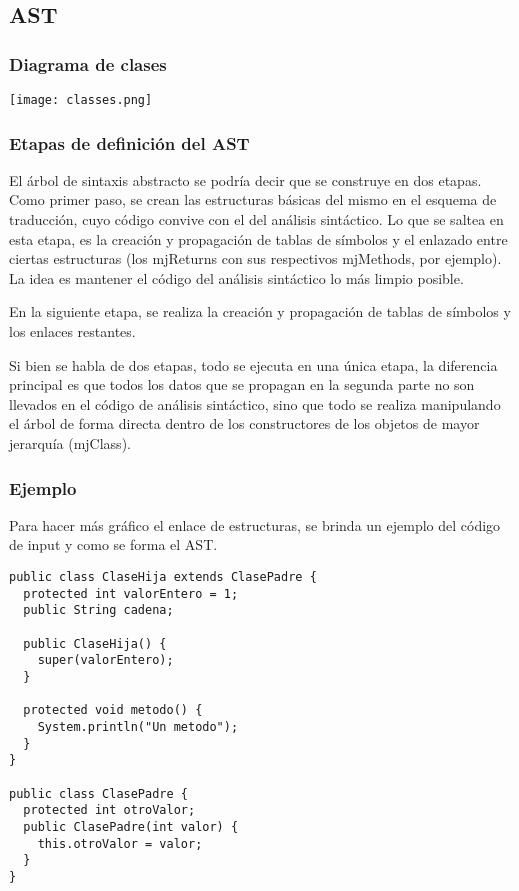 \documentclass [a4paper,abstracton,titlepage]{scrartcl}
\begin{document}
\subsection{AST}
  \subsubsection{Diagrama de clases}

    \texttt{[image: classes.png]}

  \subsubsection{Etapas de definición del AST}

El árbol de sintaxis abstracto se podría decir que se construye en dos etapas.
Como primer paso, se crean las estructuras básicas del mismo en el esquema de
traducción, cuyo código convive con el del análisis sintáctico. Lo que se
saltea en esta etapa, es la creación y propagación de tablas de símbolos y el
enlazado entre ciertas estructuras (los mjReturns con sus respectivos
mjMethods, por ejemplo). La idea es mantener el código del análisis sintáctico
lo más limpio posible.

En la siguiente etapa, se realiza la creación y propagación de tablas de
símbolos y los enlaces restantes.

Si bien se habla de dos etapas, todo se ejecuta en una única etapa, la
diferencia principal es que todos los datos que se propagan en la segunda parte
no son llevados en el código de análisis sintáctico, sino que todo se realiza
manipulando el árbol de forma directa dentro de los constructores de los
objetos de mayor jerarquía (mjClass).

    \subsubsection{Ejemplo}

Para hacer más gráfico el enlace de estructuras, se brinda un ejemplo del
código de input y como se forma el AST.

\begin{lstlisting}
public class ClaseHija extends ClasePadre {
  protected int valorEntero = 1;
  public String cadena;

  public ClaseHija() {
    super(valorEntero);
  }

  protected void metodo() {
    System.println("Un metodo");
  }
}

public class ClasePadre {
  protected int otroValor;
  public ClasePadre(int valor) {
    this.otroValor = valor;
  }
}
\end{lstlisting}
\end{document}
